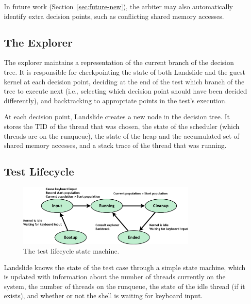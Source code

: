 In future work (Section~\ref{sec:future-new}), the arbiter may also automatically identify extra decision points, such as conflicting shared memory accesses.

\subsection{The Explorer}
\label{sec:components-explore}

The explorer maintains a representation of the current branch of the decision tree. It is responsible for checkpointing the state of both Landslide and the guest kernel at each decision point, deciding at the end of the test which branch of the tree to execute next (i.e., selecting which decision point should have been decided differently), and backtracking to appropriate points in the test's execution.

At each decision point, Landslide creates a new node in the decision tree. It stores the TID of the thread that was chosen, the state of the scheduler (which threads are on the runqueue), the state of the heap and the accumulated set of shared memory accesses, and a stack trace of the thread that was running.

\subsection{Test Lifecycle}
\label{sec:components-test}

\begin{figure}[h]
	\begin{center}
		\includegraphics[width=0.8\textwidth]{teststate.png}
	\end{center}
	\caption{The test lifecycle state machine.}
	\label{fig:teststate}
\end{figure}
Landslide knows the state of the test case through a simple state machine, which is updated with information about the number of threads currently on the system, the number of threads on the runqueue, the state of the idle thread (if it exists), and whether or not the shell is waiting for keyboard input.

